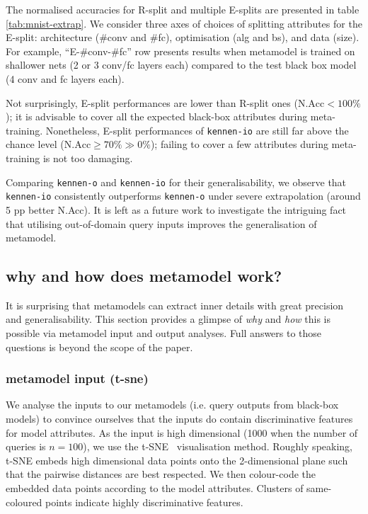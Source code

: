 \documentclass{article} %
\newcommand{\OR}{\texttt{kennen-o}\xspace}
\newcommand{\ORIC}{\texttt{kennen-io}\xspace}
\begin{document}
The normalised accuracies for R-split and multiple E-splits are presented in table \ref{tab:mnist-extrap}. We consider three axes of choices of splitting attributes for the E-split: architecture (\#\ignorespaces conv and \#\ignorespaces fc), optimisation (alg and bs), and data (size). For example, ``E-\#\ignorespaces conv-\#\ignorespaces fc'' row presents results when metamodel is trained on shallower nets (2 or 3 conv/fc layers each) compared to the test black box model (4 conv and fc layers each).

Not surprisingly, E-split performances are lower than R-split ones ($\text{N.Acc}<100\%$); it is advisable to cover all the expected black-box attributes during meta-training. Nonetheless, E-split performances of \ORIC are still far above the chance level ($\text{N.Acc}\geq 70\%\gg 0\%$); failing to cover a few attributes during meta-training is not too damaging.

Comparing \OR and \ORIC for their generalisability, we observe that \ORIC consistently outperforms \OR under severe extrapolation (around 5 pp better N.Acc). It is left as a future work to investigate the intriguing fact that utilising out-of-domain query inputs improves the generalisation of metamodel.

\subsection{why and how does metamodel work?}
\label{subsec:why-and-how}

It is surprising that metamodels can extract inner details with great precision and generalisability. This section provides a glimpse of \emph{why} and \emph{how} this is possible via metamodel input and output analyses. Full answers to those questions is beyond the scope of the paper.

\subsubsection*{metamodel input (t-sne)}

We analyse the inputs to our metamodels (i.e. query outputs from black-box models) to convince ourselves that the inputs do contain discriminative features for model attributes. As the input is high dimensional (1000 when the number of queries is $n=100$), we use the t-SNE~\citep{tsne} visualisation method. Roughly speaking, t-SNE embeds high dimensional data points onto the 2-dimensional plane such that the pairwise distances are best respected. We then colour-code the embedded data points according to the model attributes. Clusters of same-coloured points indicate highly discriminative features.
\end{document}
